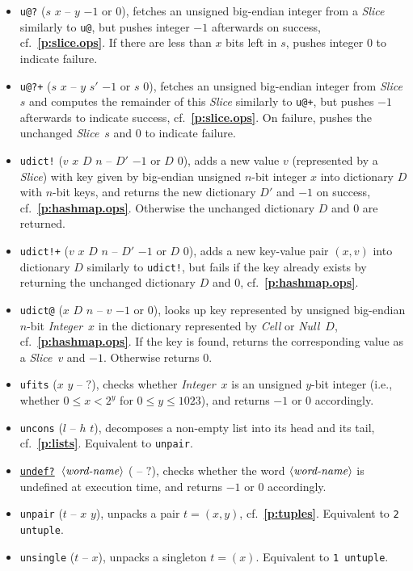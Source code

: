 \documentclass[12pt,oneside]{article}
\def\refpoint#1{{\rm\textbf{\ref{#1}}}}
\let\ptref=\refpoint
\begin{document}
\begin{itemize}
\item {\tt u@?} ($s$ $x$ -- $y$ $-1$ or $0$), fetches an unsigned big-endian integer from a {\em Slice\/} similarly to {\tt u@}, but pushes integer $-1$ afterwards on success, cf.~\ptref{p:slice.ops}. If there are less than $x$ bits left in $s$, pushes integer $0$ to indicate failure.
\item {\tt u@?+} ($s$ $x$ -- $y$ $s'$ $-1$ or $s$ $0$), fetches an unsigned big-endian integer from {\em Slice\/}~$s$ and computes the remainder of this {\em Slice\/} similarly to {\tt u@+}, but pushes $-1$ afterwards to indicate success, cf.~\ptref{p:slice.ops}. On failure, pushes the unchanged {\em Slice\/}~$s$ and $0$ to indicate failure.
\item {\tt udict!} ($v$ $x$ $D$ $n$ -- $D'$ $-1$ or $D$ $0$), adds a new value $v$ (represented by a {\em Slice\/}) with key given by big-endian unsigned $n$-bit integer $x$ into dictionary $D$ with $n$-bit keys, and returns the new dictionary $D'$ and $-1$ on success, cf.~\ptref{p:hashmap.ops}. Otherwise the unchanged dictionary $D$ and $0$ are returned.
\item {\tt udict!+} ($v$ $x$ $D$ $n$ -- $D'$ $-1$ or $D$ $0$), adds a new key-value pair $(x,v)$ into dictionary $D$ similarly to {\tt udict!}, but fails if the key already exists by returning the unchanged dictionary $D$ and $0$, cf.~\ptref{p:hashmap.ops}.
\item {\tt udict@} ($x$ $D$ $n$ -- $v$ $-1$ or $0$), looks up key represented by unsigned big-endian $n$-bit {\em Integer\/}~$x$ in the dictionary represented by {\em Cell\/} or {\em Null\/}~$D$, cf.~\ptref{p:hashmap.ops}. If the key is found, returns the corresponding value as a {\em Slice\/}~$v$ and $-1$. Otherwise returns $0$.
\item {\tt ufits} ($x$ $y$ -- $?$), checks whether {\em Integer\/}~$x$ is an unsigned $y$-bit integer (i.e., whether $0\leq x<2^y$ for $0\leq y\leq 1023$), and returns $-1$ or $0$ accordingly.
\item {\tt uncons} ($l$ -- $h$ $t$), decomposes a non-empty list into its head and its tail, cf.~\ptref{p:lists}. Equivalent to {\tt unpair}.
\item {\tt \underline{undef?} $\langle\textit{word-name\/}\rangle$} ( -- $?$), checks whether the word $\langle\textit{word-name\/}\rangle$ is undefined at execution time, and returns $-1$ or $0$ accordingly.
\item {\tt unpair} ($t$ -- $x$ $y$), unpacks a pair $t=(x,y)$, cf.~\ptref{p:tuples}. Equivalent to {\tt 2 untuple}.
\item {\tt unsingle} ($t$ -- $x$), unpacks a singleton $t=(x)$. Equivalent to {\tt 1 untuple}.

\end{itemize}
\end{document}
